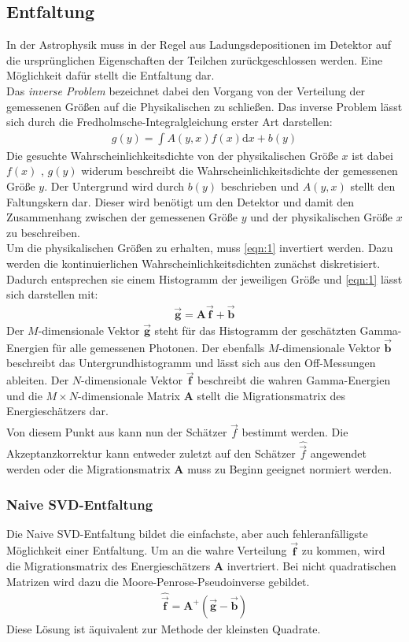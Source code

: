 \subsection{Entfaltung}
In der Astrophysik muss in der Regel aus Ladungsdepositionen im Detektor auf die ursprünglichen Eigenschaften der Teilchen zurückgeschlossen werden. Eine Möglichkeit dafür stellt die Entfaltung dar.\\
Das \textit{inverse Problem} bezeichnet dabei den Vorgang von der Verteilung der gemessenen Größen auf die Physikalischen zu schließen. Das inverse Problem lässt sich durch die Fredholmsche-Integralgleichung erster Art darstellen:
\begin{align}
	g(y)=\int A(y,x)f(x)\text{d}x + b(y)
	\label{eqn:1}
\end{align}
Die gesuchte Wahrscheinlichkeitsdichte von der physikalischen Größe $x$ ist dabei $f(x)$ , $g(y)$ widerum beschreibt die Wahrscheinlichkeitsdichte der gemessenen Größe $y$. Der Untergrund wird durch $b(y)$ beschrieben und $A(y,x)$ stellt den Faltungskern dar. Dieser wird benötigt um den Detektor und damit den Zusammenhang zwischen der gemessenen Größe $y$ und der physikalischen Größe $x$ zu beschreiben. \\
Um die physikalischen Größen zu erhalten, muss \eqref{eqn:1} invertiert werden. Dazu werden die kontinuierlichen Wahrscheinlichkeitsdichten zunächst diskretisiert. Dadurch entsprechen sie einem Histogramm der jeweiligen Größe und \eqref{eqn:1} lässt sich darstellen mit:
\begin{align}
	\vec{\pmb{g}} = \pmb{A}\vec{\pmb{f}} + \vec{\pmb{b}}
\end{align}
Der $M$-dimensionale Vektor $\vec{\pmb{g}}$ steht für das Histogramm der geschätzten Gamma-Energien für alle gemessenen Photonen. Der ebenfalls $M$-dimensionale Vektor $\vec{\pmb{b}}$ beschreibt das Untergrundhistogramm und lässt sich aus den Off-Messungen ableiten. Der $N$-dimensionale Vektor $\vec{\pmb{f}}$ beschreibt die wahren Gamma-Energien und die $M\times N$-dimensionale Matrix $\pmb{A}$ stellt die Migrationsmatrix des Energieschätzers dar. \\
Von diesem Punkt aus kann nun der Schätzer $\hat{\vec{f}}$ bestimmt werden. Die Akzeptanzkorrektur kann entweder zuletzt auf den Schätzer $\hat{\vec{f}}$ angewendet werden oder die Migrationsmatrix $\pmb{A}$ muss zu Beginn geeignet normiert werden.
\subsubsection{Naive SVD-Entfaltung}
Die Naive SVD-Entfaltung bildet die einfachste, aber auch fehleranfälligste Möglichkeit einer Entfaltung. Um an die wahre Verteilung $\vec{\pmb{f}}$ zu kommen, wird die Migrationsmatrix des Energieschätzers $\pmb{A}$ invertriert. Bei nicht quadratischen Matrizen wird dazu die Moore-Penrose-Pseudoinverse gebildet.\\
\begin{align}
	\hat{\vec{\pmb{f}}} = \pmb{A}^{+}(\vec{\pmb{g}} - \vec{\pmb{b}})
	\label{eqn:NSVD}
\end{align}
Diese Lösung ist äquivalent zur Methode der kleinsten Quadrate.
